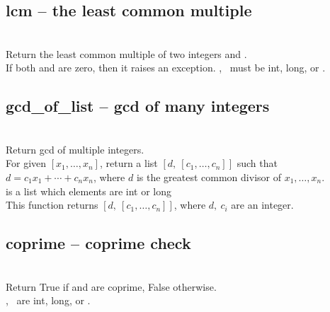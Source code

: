   \subsection{lcm -- the least common multiple}
   \\
   \spacing
   \quad Return the least common multiple of two integers  and .\\
   \spacing
   \negok If both  and  are zero, then it raises an exception.
   \spacing
   \quad {},\  must be int, long, or .\\
%
  \subsection{gcd\_of\_list -- gcd of many integers}
   \\
   \spacing
   \quad Return gcd of multiple integers.\\
   \spacing
   \quad For given  $[x_1,\ldots,x_n]$, return a list $[d,\ [c_1,\ldots,c_n]]$ such that $d=c_1 x_1+\cdots+c_n x_n$, where $d$ is the greatest common divisor of $x_1,\ldots, x_n$.\\
   \spacing
   \quad {} is a list which elements are int or long\\
   This function returns $[d,\ [c_1,\ldots,c_n]]$, where $d,\ c_i$ are an integer.\\
%
  \subsection{coprime -- coprime check}
   \\
   \spacing
   \quad Return True if  and  are coprime, False otherwise.\\
   \spacing
   \quad {},\  are int, long, or .\\
%
